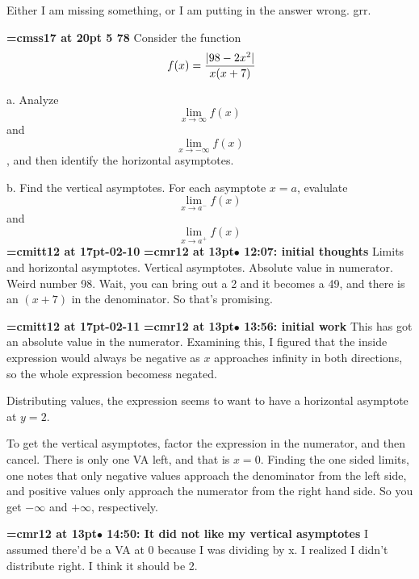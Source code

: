 Either I am missing something, or I am putting in the answer wrong. grr.
\par

{\medskip\noindent\bf\font\titlefont=cmss17 at 20pt 5 78}\medskip
Consider the function
$$\
f(x) = {
|98 - 2x^2|
\over
x(x + 7)
}
$$
\par a. Analyze $$\lim_{x \to \infty}{f(x)}$$ and
$$\lim_{x \to -\infty}{f(x)}$$, and then identify the horizontal
asymptotes.
\par b. Find the vertical asymptotes. For each asymptote $x = a$,
evalulate $$\lim_{x \to a^{-}}{f(x)}$$ and $$\lim_{x \to a^{+}}{f(x)}$$
{\medskip\noindent\bf\font\titlefont=cmitt12 at 17pt\titlefont 2026-02-10}\medskip
{\smallskip\noindent\bf\font\titlefont=cmr12 at 13pt\titlefont $\bullet$ 12:07: initial thoughts}\smallskip
Limits and horizontal asymptotes. Vertical asymptotes. Absolute value in numerator. Weird number 98. Wait, you can bring out a 2 and it becomes a 49, and there is an $(x + 7)$ in the denominator. So that's promising.
\par

{\medskip\noindent\bf\font\titlefont=cmitt12 at 17pt-02-11}\medskip
{\smallskip\noindent\bf\font\titlefont=cmr12 at 13pt\titlefont $\bullet$ 13:56: initial work}\smallskip
This has got an absolute value in the numerator. Examining this, I figured that the inside expression would always be negative as $x$ approaches infinity in both directions, so the whole expression becomess negated.
\par

Distributing values, the expression seems to want to have a horizontal asymptote at $y=2$.
\par

To get the vertical asymptotes, factor the expression in the numerator, and then cancel. There is only one VA left, and that is $x=0$. Finding the one sided limits, one notes that only negative values approach the denominator from the left side, and positive values only approach the numerator from the right hand side. So you get $-\infty$ and $+\infty$, respectively.
\par

{\smallskip\noindent\bf\font\titlefont=cmr12 at 13pt\titlefont $\bullet$ 14:50: It did not like my vertical asymptotes}\smallskip
I assumed there'd be a VA at 0 because I was dividing by x. I realized I didn't distribute right. I think it should be 2.
\par

